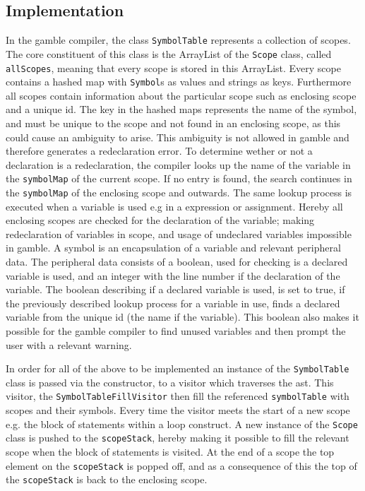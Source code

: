 \subsection*{Implementation}
In the \gls{gamble} compiler, the class \texttt{SymbolTable} represents a collection of scopes.
The core constituent of this class is the ArrayList of the \texttt{Scope} class, called \texttt{allScopes}, meaning that every scope is stored in this ArrayList.
Every scope contains a hashed map with \texttt{Symbol}s as values and strings as keys.
Furthermore all scopes contain information about the particular scope such as enclosing scope and a unique id. 
The key in the hashed maps represents the name of the symbol, and must be unique to the scope and not found in an enclosing scope, as this could cause an ambiguity to arise.
This ambiguity is not allowed in \gls{gamble} and therefore generates a redeclaration error.
To determine wether or not a declaration is a redeclaration, the compiler looks up the name of the variable in the \texttt{symbolMap} of the current scope.
If no entry is found, the search continues in the \texttt{symbolMap} of the enclosing scope and outwards.
The same lookup process is executed when a variable is used e.g in a expression or assignment.
Hereby all enclosing scopes are checked for the declaration of the variable; making redeclaration of variables in scope, and usage of undeclared variables impossible in \gls{gamble}.
A symbol is an encapsulation of a variable and relevant peripheral data.
The peripheral data consists of a boolean, used for checking is a declared variable is used, and an integer with the line number if the declaration of the variable.
The boolean describing if a declared variable is used, is set to true, if the previously described lookup process for a variable in use, finds a declared variable from the unique id (the name if the variable).
This boolean also makes it possible for the \gls{gamble} compiler to find unused variables and then prompt the user with a relevant warning.

In order for all of the above to be implemented an instance of the \texttt{SymbolTable} class is passed via the constructor, to a visitor which traverses the \acrfull{ast}.
This visitor, the \texttt{SymbolTableFillVisitor} then fill the referenced \texttt{symbolTable} with scopes and their symbols.
Every time the visitor meets the start of a new scope e.g. the block of statements within a loop construct.
A new instance of the \texttt{Scope} class is pushed to the \texttt{scopeStack}, hereby making it possible to fill the relevant scope when the block of statements is visited.
At the end of a scope the top element on the \texttt{scopeStack} is popped off, and as a consequence of this the top of the \texttt{scopeStack} is back to the enclosing scope.
